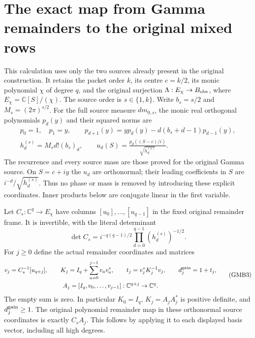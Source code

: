 \documentclass[11pt,a4paper]{article}
\begin{document}


\section{The exact map from Gamma remainders to the original mixed rows}
\label{sec:GMB}

This calculation uses only the two sources already present in the
original construction. It retains the packet order $k$, its centre
$c=k/2$, its monic polynomial $\chi$ of degree $q$, and the original
surjection $\Lambda:E_\chi\to B_{\rm obs}$, where
$E_\chi=\mathbb C[S]/(\chi)$. The source order is $s\in\{1,k\}$.
Write $b_s=s/2$ and $M_s=(2\pi)^{s/2}$. For the full source measure
$dm_{0,s}$, the monic real orthogonal polynomials $p_d(y)$ and their
squared norms are
\[
\begin{gathered}
 p_0=1,\quad p_1=y,\qquad
 p_{d+1}(y)=yp_d(y)-d(b_s+d-1)p_{d-1}(y),\\
 h_d^{(s)}=M_s d!(b_s)_d,\qquad
 u_d(S)=\frac{p_d((S-c)/i)}{\sqrt{h_d^{(s)}}}.
\end{gathered}\tag{GMB1}
\]
The recurrence and every source mass are those proved for the
original Gamma source. On $S=c+iy$ the $u_d$ are orthonormal;
their leading coefficients in $S$ are $i^{-d}/\sqrt{h_d^{(s)}}$.
Thus no phase or mass is removed by introducing these explicit
coordinates. Inner products below are conjugate linear in the
first variable.

Let $C_s:\mathbb C^q\to E_\chi$ have columns
$[u_0],\ldots,[u_{q-1}]$ in the fixed original remainder frame.
It is invertible, with the literal determinant
\[
 \det C_s=i^{-q(q-1)/2}\prod_{d=0}^{q-1}(h_d^{(s)})^{-1/2}.
 \tag{GMB2}
\]
For $j\geq0$ define the actual remainder coordinates and matrices
\[
\begin{gathered}
 v_j=C_s^{-1}[u_{q+j}],\qquad
 K_j=I_q+\sum_{a=0}^{j-1}v_av_a^*,\qquad
 t_j=v_j^*K_j^{-1}v_j,\qquad d_j^{\rm gain}=1+t_j,\\
 A_j=[I_q,v_0,\ldots,v_{j-1}]:\mathbb C^{q+j}\to\mathbb C^q.
\end{gathered}\tag{GMB3}
\]
The empty sum is zero. In particular $K_0=I_q$, $K_j=A_jA_j^*$
is positive definite, and $d_j^{\rm gain}\geq1$.
The original polynomial remainder map in these orthonormal source
coordinates is exactly $C_sA_j$. This follows by applying it to
each displayed basis vector, including all high degrees.
\end{document}
